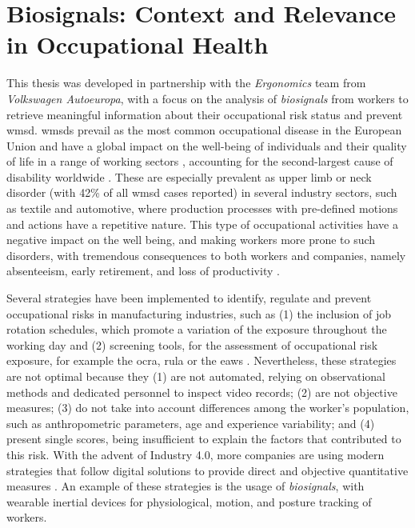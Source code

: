 \section{Biosignals: Context and Relevance in Occupational Health} 
\label{sub:context2}

This thesis was developed in partnership with the \textit{Ergonomics} team from \textit{Volkswagen Autoeuropa}, with a focus on the analysis of \textit{biosignals} from workers to retrieve meaningful information about their occupational risk status and prevent \gls{wmsd}. \gls{wmsd}s prevail as the most common occupational disease in the European Union and have a global impact on the well-being of individuals and their quality of life in a range of working sectors \cite{Irastorza2010}, accounting for the second-largest cause of disability worldwide \cite{Luttmann2003}. These are especially prevalent as upper limb or neck disorder (with 42\% of all \gls{wmsd} cases reported) \cite{Seidel2019} in several industry sectors, such as textile and automotive, where production processes with pre-defined motions and actions have a repetitive nature. This type of occupational activities have a negative impact on the well being, and making workers more prone to such disorders, with tremendous consequences to both workers and companies, namely absenteeism, early retirement, and loss of productivity \cite{Trabalhadores, Varandas19}. 

Several strategies have been implemented to identify, regulate and prevent occupational risks in manufacturing industries, such as (1) the inclusion of job rotation schedules, which promote a variation of the exposure throughout the working day \cite{jobrotation1, jobrotation2} and (2) screening tools, for the assessment of occupational risk exposure, for example the \gls{ocra}, \gls{rula} or the \gls{eaws} \cite{ocra, rula, eaws}. Nevertheless, these strategies are not optimal because they (1) are not automated, relying on observational methods and dedicated personnel to inspect video records; (2) are not objective measures; (3) do not take into account differences among the worker's population, such as anthropometric parameters, age and experience variability; and (4) present single scores, being insufficient to explain the factors that contributed to this risk. With the advent of Industry 4.0, more companies are using modern strategies that follow digital solutions to provide direct and objective quantitative measures \cite{romero}. An example of these strategies is the usage of \textit{biosignals}, with wearable inertial devices for physiological, motion, and posture tracking of workers.

